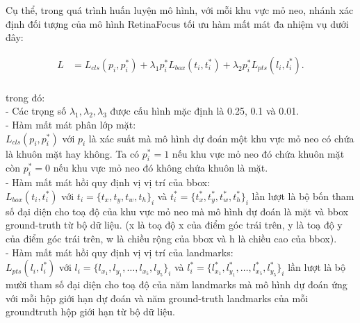 {    \noindent
    Cụ thể, trong quá trình huấn luyện mô hình, với mỗi khu vực mỏ neo, nhánh xác định đối tượng của mô hình RetinaFocus tối ưu hàm mất mát đa nhiệm vụ dưới đây:

    \begin{equation}
        \begin{split}
        L  & =  L_{cls}(p_i, p^{*}_i) + \lambda_1 p^{*}_i L_{box}(t_i, t^{*}_i) + \lambda_2 p^{*}_i L_{pts} (l_i, l^{*}_i).\\
        \end{split}
        \label{eq:retinaface_loss}
    \end{equation}

    \noindent
    trong đó: \\
    - Các trọng số $\lambda_1, \lambda_2, \lambda_3$ được cấu hình mặc định là 0.25, 0.1 và 0.01. \\
    - Hàm mất mát phân lớp mặt: \\
    $L_{cls}(p_i, p^{*}_i)$ với $p_i$ là xác suất mà mô hình dự đoán một khu vực mỏ neo có chứa là khuôn mặt hay không.
    Ta có $p^{*}_i = 1$ nếu khu vực mỏ neo đó chứa khuôn mặt còn $p^{*}_i = 0$ nếu khu vực mỏ neo đó không chứa khuôn là mặt. \\
    - Hàm mất mát hồi quy định vị vị trí của bbox: \\
    $L_{box}(t_i, t^{*}_i)$ với $t_i=\{t_x, t_y, t_w, t_h\}_i$ và $t^{*}_i=\{t^{*}_x, t^{*}_y, t^{*}_w, t^{*}_h\}_i$ lần lượt là bộ bốn tham số đại diện cho toạ độ của khu vực mỏ neo mà mô hình dự đoán là mặt và bbox ground-truth từ bộ dữ liệu.
    (x là toạ độ x của điểm góc trái trên, y là toạ độ y của điểm góc trái trên, w là chiều rộng của bbox và h là chiều cao của bbox). \\
    - Hàm mất mát hồi quy định vị vị trí của landmarks: \\
    $L_{pts} (l_i, l^{*}_i)$ với $l_i=\{l_{x_1}, l_{y_1}, \dots , l_{x_5}, l_{y_5}\}_i$ và $l^{*}_i=\{l^{*}_{x_1}, l^{*}_{y_1}, \dots , l^{*}_{x_5}, l^{*}_{y_5}\}_i$ lần lượt là bộ mười tham số đại diện cho toạ độ của năm landmarks mà mô hình dự đoán ứng với mỗi hộp giới hạn dự đoán và năm ground-truth landmarks của mỗi groundtruth hộp giới hạn từ bộ dữ liệu.
}